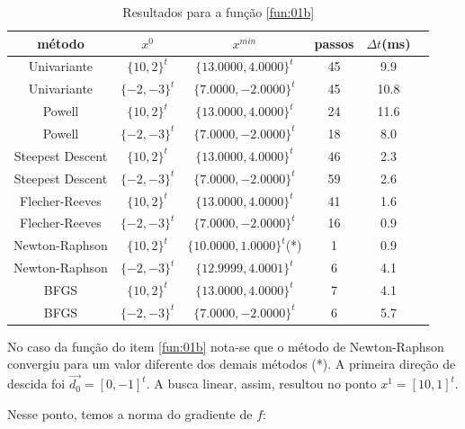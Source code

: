 \documentclass[10pt, a4paper]{article}
\begin{document}
\begin{table}[H]
      \small
      \centering
      \caption{Resultados para a fun\c c\~ao \ref{fun:01b}}
      \begin{tabular}{c|c|c|c|c|c}
            m\'etodo           & $x^0$ & $x^{min}$ & passos & $\Delta t$(ms) \\
            \hline
            Univariante         & $\{10,2\}^t$    & $\{13.0000,4.0000\}^t$  & 45 & 9.9 \\
            Univariante         & $\{-2,-3\}^t$   & $\{7.0000,-2.0000\}^t$  & 45 & 10.8 \\
            \hline
            Powell              & $\{10,2\}^t$    & $\{13.0000,4.0000\}^t$  & 24 & 11.6 \\
            Powell              & $\{-2,-3\}^t$   & $\{7.0000,-2.0000\}^t$  & 18 & 8.0 \\
            \hline
            Steepest Descent    & $\{10,2\}^t$    & $\{13.0000,4.0000\}^t$  & 46 & 2.3 \\
            Steepest Descent    & $\{-2,-3\}^t$   & $\{7.0000,-2.0000\}^t$  & 59 & 2.6 \\
            \hline
            Flecher-Reeves     & $\{10,2\}^t$    & $\{13.0000,4.0000\}^t$  & 41 & 1.6 \\
            Flecher-Reeves     & $\{-2,-3\}^t$   & $\{7.0000,-2.0000\}^t$  & 16 & 0.9 \\
            \hline
            Newton-Raphson     & $\{10,2\}^t$    & $\{10.0000,1.0000\}^t$(*)  &  1 & 0.9 \\
            Newton-Raphson     & $\{-2,-3\}^t$   & $\{12.9999,4.0001\}^t$  &  6 & 4.1 \\
            \hline
            BFGS                & $\{10,2\}^t$    & $\{13.0000,4.0000\}^t$  &  7 & 4.1 \\
            BFGS                & $\{-2,-3\}^t$   & $\{7.0000,-2.0000\}^t$  &  6 & 5.7 \\
      \end{tabular}
      \label{table:resultadosf1b}
\end{table}

No caso da fun\c c\~ao do item \ref{fun:01b} nota-se que o m\'etodo de Newton-Raphson convergiu para um valor diferente dos demais m\'etodos (*). A primeira dire\c c\~ao de descida foi $\vec{d_{0}} = [0, -1]^t$. A busca linear, assim, resultou no ponto $x^1 = [10, 1]^t$.

Nesse ponto, temos a norma do gradiente de $f$:
\end{document}
